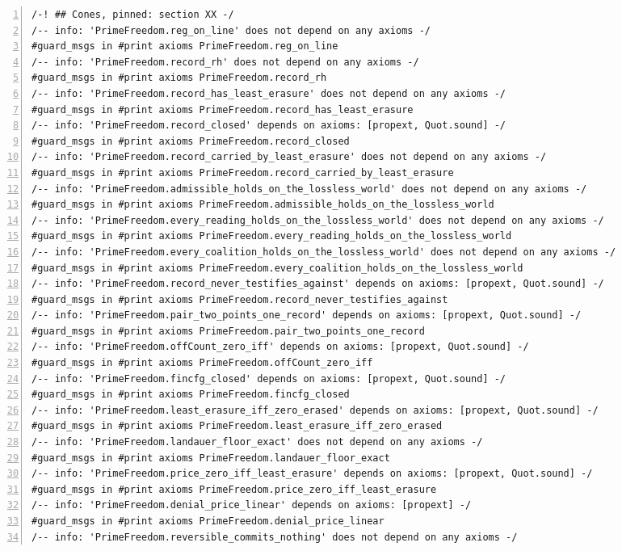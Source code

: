 \documentclass[10pt]{article}
\newcommand{\leansize}{\fontsize{5.5pt}{6.75pt}\selectfont}
\begin{document}
\begin{multicols}{2}
\begin{Verbatim}[numbers=left,firstnumber=1,numbersep=3pt,xleftmargin=2.6em,breaklines=true,breakanywhere=true,breakautoindent=false,breakindent=1.4em,breaksymbolleft={},breakanywheresymbolpre={},fontsize=\leansize]
/-! ## Cones, pinned: section XX -/
/-- info: 'PrimeFreedom.reg_on_line' does not depend on any axioms -/
#guard_msgs in #print axioms PrimeFreedom.reg_on_line
/-- info: 'PrimeFreedom.record_rh' does not depend on any axioms -/
#guard_msgs in #print axioms PrimeFreedom.record_rh
/-- info: 'PrimeFreedom.record_has_least_erasure' does not depend on any axioms -/
#guard_msgs in #print axioms PrimeFreedom.record_has_least_erasure
/-- info: 'PrimeFreedom.record_closed' depends on axioms: [propext, Quot.sound] -/
#guard_msgs in #print axioms PrimeFreedom.record_closed
/-- info: 'PrimeFreedom.record_carried_by_least_erasure' does not depend on any axioms -/
#guard_msgs in #print axioms PrimeFreedom.record_carried_by_least_erasure
/-- info: 'PrimeFreedom.admissible_holds_on_the_lossless_world' does not depend on any axioms -/
#guard_msgs in #print axioms PrimeFreedom.admissible_holds_on_the_lossless_world
/-- info: 'PrimeFreedom.every_reading_holds_on_the_lossless_world' does not depend on any axioms -/
#guard_msgs in #print axioms PrimeFreedom.every_reading_holds_on_the_lossless_world
/-- info: 'PrimeFreedom.every_coalition_holds_on_the_lossless_world' does not depend on any axioms -/
#guard_msgs in #print axioms PrimeFreedom.every_coalition_holds_on_the_lossless_world
/-- info: 'PrimeFreedom.record_never_testifies_against' depends on axioms: [propext, Quot.sound] -/
#guard_msgs in #print axioms PrimeFreedom.record_never_testifies_against
/-- info: 'PrimeFreedom.pair_two_points_one_record' depends on axioms: [propext, Quot.sound] -/
#guard_msgs in #print axioms PrimeFreedom.pair_two_points_one_record
/-- info: 'PrimeFreedom.offCount_zero_iff' depends on axioms: [propext, Quot.sound] -/
#guard_msgs in #print axioms PrimeFreedom.offCount_zero_iff
/-- info: 'PrimeFreedom.fincfg_closed' depends on axioms: [propext, Quot.sound] -/
#guard_msgs in #print axioms PrimeFreedom.fincfg_closed
/-- info: 'PrimeFreedom.least_erasure_iff_zero_erased' depends on axioms: [propext, Quot.sound] -/
#guard_msgs in #print axioms PrimeFreedom.least_erasure_iff_zero_erased
/-- info: 'PrimeFreedom.landauer_floor_exact' does not depend on any axioms -/
#guard_msgs in #print axioms PrimeFreedom.landauer_floor_exact
/-- info: 'PrimeFreedom.price_zero_iff_least_erasure' depends on axioms: [propext, Quot.sound] -/
#guard_msgs in #print axioms PrimeFreedom.price_zero_iff_least_erasure
/-- info: 'PrimeFreedom.denial_price_linear' depends on axioms: [propext] -/
#guard_msgs in #print axioms PrimeFreedom.denial_price_linear
/-- info: 'PrimeFreedom.reversible_commits_nothing' does not depend on any axioms -/

\end{Verbatim}
\end{multicols}
\end{document}
